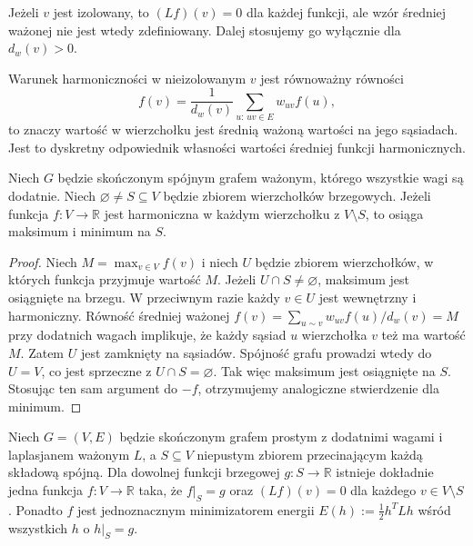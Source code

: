 Jeżeli $v$ jest izolowany, to $(Lf)(v)=0$ dla każdej funkcji,
ale wzór średniej ważonej nie jest wtedy zdefiniowany.
Dalej stosujemy go wyłącznie dla $d_w(v)>0$.

Warunek harmoniczności w nieizolowanym $v$ jest równoważny równości
\[
f(v)=\frac{1}{d_w(v)}\sum_{u:\,uv\in E}w_{uv}f(u),
\]
to znaczy wartość w wierzchołku jest średnią ważoną wartości
na jego sąsiadach. Jest to dyskretny odpowiednik
własności wartości średniej funkcji harmonicznych.

\begin{twierdzenie}
Niech $G$ będzie skończonym spójnym grafem ważonym, którego
wszystkie wagi są dodatnie. Niech $\varnothing\ne S\subseteq V$
będzie zbiorem wierzchołków brzegowych. Jeżeli funkcja
$f:V\to\mathbb R$ jest harmoniczna w każdym wierzchołku
z $V\setminus S$, to osiąga maksimum i minimum na $S$.
\end{twierdzenie}

\begin{proof}
Niech $M=\max_{v\in V}f(v)$ i niech $U$ będzie zbiorem
wierzchołków, w których funkcja przyjmuje wartość $M$.
Jeżeli $U\cap S\ne\varnothing$, maksimum jest osiągnięte
na brzegu. W przeciwnym razie każdy $v\in U$ jest
wewnętrzny i harmoniczny. Równość średniej ważonej
$f(v)=\sum_{u\sim v}w_{uv}f(u)/d_w(v)=M$ przy dodatnich wagach
implikuje, że każdy sąsiad $u$ wierzchołka $v$ też ma
wartość $M$. Zatem $U$ jest zamknięty na sąsiadów.
Spójność grafu prowadzi wtedy do $U=V$, co jest
sprzeczne z $U\cap S=\varnothing$.
Tak więc maksimum jest osiągnięte na $S$.
Stosując ten sam argument do $-f$, otrzymujemy
analogiczne stwierdzenie dla minimum.
\end{proof}

\begin{twierdzenie}
\label{thm:tg-dirichlet}
Niech $G=(V,E)$ będzie skończonym grafem prostym
z dodatnimi wagami i laplasjanem ważonym $L$,
a $S\subseteq V$ niepustym zbiorem przecinającym
każdą składową spójną. Dla dowolnej funkcji brzegowej
$g:S\to\mathbb R$ istnieje dokładnie jedna funkcja
$f:V\to\mathbb R$ taka, że $f|_S=g$ oraz
$(Lf)(v)=0$ dla każdego $v\in V\setminus S$.
Ponadto $f$ jest jednoznacznym minimizatorem energii
$E(h):=\tfrac12 h^TLh$ wśród wszystkich $h$ o $h|_S=g$.
\end{twierdzenie}


